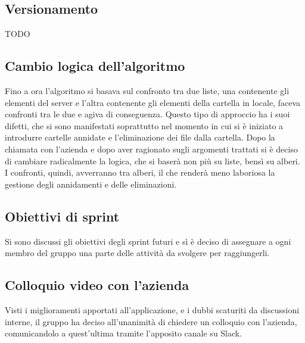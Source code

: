 \subsection{Versionamento}
TODO


\subsection{Cambio logica dell'algoritmo}
Fino a ora l'algoritmo si basava sul confronto tra due liste, una contenente gli elementi del server e l'altra contenente gli elementi della cartella in locale, faceva confronti tra le due e agiva di conseguenza. Questo tipo di approccio ha i suoi difetti, che si sono manifestati soprattutto nel momento in cui si è iniziato a introdurre cartelle annidate e l'eliminazione dei file dalla cartella. Dopo la chiamata con l'azienda e dopo aver ragionato sugli argomenti trattati si è deciso di cambiare radicalmente la logica, che si baserà non più su liste, bensì su alberi. I confronti, quindi, avverranno tra alberi, il che renderà meno laboriosa la gestione degli annidamenti e delle eliminazioni.

\subsection{Obiettivi di sprint}
Si sono discussi gli obiettivi degli sprint futuri e sì è deciso di assegnare a ogni membro del gruppo una parte delle attività da svolgere per raggiungerli. 

\subsection{Colloquio video con l'azienda}
Visti i miglioramenti apportati all'applicazione, e i dubbi scaturiti da discussioni interne, il gruppo ha deciso all'unanimità di chiedere un colloquio con l'azienda, comunicandolo a quest'ultima tramite l'apposito canale su Slack.

\newpage

